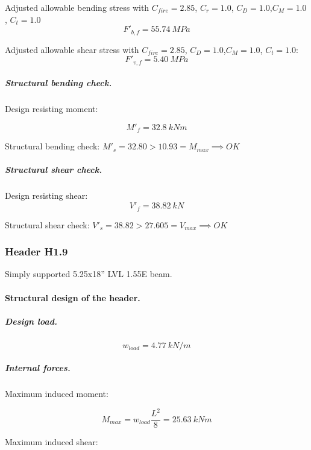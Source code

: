 \noindent Adjusted allowable bending stress with $C_{fire}= 2.85$, $C_r= 1.0$, $C_D= 1.0$,$C_M= 1.0$, $C_t= 1.0$
\begin{equation}
  F'_{b,f}= 55.74\ MPa
\end{equation}

\noindent Adjusted allowable shear stress with  $C_{fire}= 2.85$, $C_D= 1.0$,$C_M= 1.0$, $C_t= 1.0$:
\begin{equation}
  F'_{v,f}= 5.40\ MPa
\end{equation}

\subparagraph{Structural bending check.}

\noindent Design resisting moment:

\begin{equation}
  M'_f= 32.8\ kN m
\end{equation}

\noindent Structural bending check: $M'_s = 32.80 > 10.93 = M_{max} \implies OK$

\subparagraph{Structural shear check.}

\noindent Design resisting shear:
\begin{equation}
  V'_f= 38.82\ kN
\end{equation}

\noindent Structural shear check: $V'_s = 38.82 > 27.605 = V_{max} \implies OK$

\subsubsection{Header H1.9}
Simply supported 5.25x18'' LVL 1.55E beam.

\paragraph{Structural design of the header.}

\subparagraph{Design load.}

\begin{equation}
  w_{load}= 4.77\ kN/m
\end{equation}

\subparagraph{Internal forces.}

\noindent Maximum induced moment:

\begin{equation}
  M_{max}= w_{load} \frac{L^2}{8}= 25.63\ kN m
\end{equation}

\noindent Maximum induced shear:

